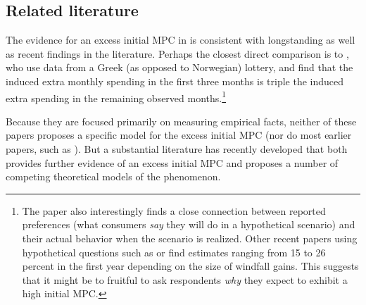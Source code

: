 \documentclass[\econtexRoot/HAFiscal]{subfiles}
\begin{document}
\hypertarget{related-literature}{}\par\subsection{Related literature}
\notinsubfile{\label{sec:lit}}

\hypertarget{excess-initial-mpc-literature}{}
\hypertarget{kotsogiannisMPCs}{}

The evidence for an excess initial MPC in \cite{fagereng_mpc_2021} is consistent with longstanding as well as recent findings in the literature.  Perhaps the closest direct comparison is to \cite{kotsogiannisMPCs}, who use data from a Greek (as opposed to Norwegian) lottery, and find that the induced extra monthly spending in the first three months is triple the induced extra spending in the remaining observed months.\footnote{The paper also interestingly finds a close connection between reported preferences (what consumers \textit{say} they will do in a hypothetical scenario) and their actual behavior when the scenario is realized.  Other recent papers using hypothetical questions such as \cite{jappelliIntertemporal} or \cite{colarietiHow} find estimates ranging from 15 to 26 percent in the first year depending on the size of windfall gains. This suggests that it might be to fruitful to ask respondents \textit{why} they expect to exhibit a high initial MPC.}  

Because they are focused primarily on measuring empirical facts, neither of these papers proposes a specific model for the excess initial MPC (nor do most earlier papers, such as \cite{parker2013consumer,jpsTax}).  But a substantial literature has recently developed that both provides further evidence of an excess initial MPC and proposes a number of competing theoretical models of the phenomenon.  

\hypertarget{laibson2022simple}{}
\end{document}
